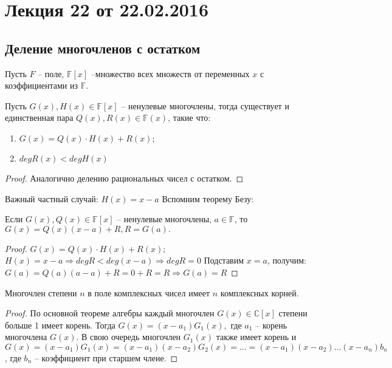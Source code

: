 


\renewcommand{\phi}{\varphi}

\section{Лекция 22 от 22.02.2016}

\subsection*{Деление многочленов с остатком}

Пусть $F$ -- поле, $\mathbb{F}[x]$ --множество всех множеств от переменных $x$ с коэффициентами из $\mathbb{F}$.
\begin{Theorem}
	Пусть $G(x), H(x) \in \mathbb{F}[x]$ -- ненулевые многочлены, тогда существует и единственная пара $Q(x), R(x) \in \mathbb{F}(x)$, такие что:
	\begin{enumerate}
		\item $G(x) = Q(x)\cdot H(x) + R(x);$
		\item $degR(x) < degH(x)$
	\end{enumerate}
\end{Theorem}
\begin{proof}
Аналогично делению рациональных чисел с остатком.
\end{proof}
Важный частный случай: $H(x) = x - a$
Вспомним теорему Безу:
\begin{Theorem}
	Если $G(x), Q(x) \in \mathbb{F}[x]$ -- ненулевые многочлены, $a \in \mathbb{F}$, то $G(x) = Q(x)(x - a) + R, R = G(a).$
\end{Theorem}
\begin{proof}
	$G(x) = Q(x)\cdot H(x) + R(x);$
	$H(x) = x - a \Rightarrow degR < deg(x - a) \Rightarrow degR = 0$
	Подставим $x = a$, получим:
	$G(a) = Q(a)(a-a) + R = 0 + R = R \Rightarrow G(a) = R$
\end{proof}
\begin{Theorem}
	Многочлен степени $n$ в поле комплексных чисел имеет $n$ комплексных корней.
\end{Theorem}
\begin{proof}
	По основной теореме алгебры каждый многочлен $G(x) \in \mathbb{C}[x]$ степени больше 1 имеет корень. Тогда $G(x) = (x - a_1)G_1(x),$ где $a_1$ -- корень многочлена $G(x)$. В свою очередь многочлен $G_1(x)$ также имеет корень и $G(x) = (x - a_1)G_1(x) = (x - a_1)(x - a_2)G_2(x) = \ldots = (x - a_1)(x - a_2)\ldots(x - a_n)b_n$, где $b_n$ -- коэффициент при старшем члене.
\end{proof}
